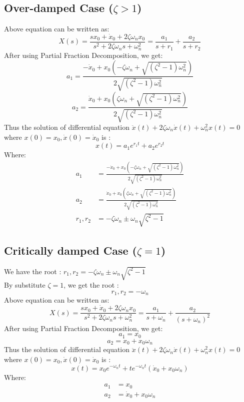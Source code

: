 \documentclass[12pt,a4paper]{article}
\begin{document}
	\subsection{Over-damped Case ($ \zeta > 1$)}
	Above equation can be written as:
	\[ 
	X(s) = \frac{sx_0 + \dot{x}_0 + 2\zeta\omega_nx_0}{s^2 + 2\zeta\omega_ns+\omega_n^2} = \frac{a_1}{s+r_1}+\frac{a_2}{s+r_2}
	\]
	After using Partial Fraction Decomposition, we get:
	\[ 
	a_1 = \frac{-\dot{x}_0 + x_0 (-\zeta \omega_n + \sqrt{(\zeta^2-1)\omega_n^2})}{2\sqrt{(\zeta^2-1)\omega_n^2}}
	\]
	\[ 
	a_2 = \frac{\dot{x}_0 + x_0 (\zeta \omega_n + \sqrt{(\zeta^2-1)\omega_n^2})}{2\sqrt{(\zeta^2-1)\omega_n^2}}
	\]
	Thus the solution of differential equation $ \ddot{x}(t)+2\zeta\omega_n\dot{x}(t)+\omega_n^2x(t)=0  $ where $ x(0)=x_0, \dot{x}(0) = \dot{x}_0 $ is :
	\[ 
	x(t) = a_1e^{r_1t}+a_2e^{r_2t} 
	\]
	Where:
	\[
	\begin{split}
		a_1 &= \frac{-\dot{x}_0 + x_0 (-\zeta \omega_n + \sqrt{(\zeta^2-1)\omega_n^2})}{2\sqrt{(\zeta^2-1)\omega_n^2}} \\
		a_2 &= \frac{\dot{x}_0 + x_0 (\zeta \omega_n + \sqrt{(\zeta^2-1)\omega_n^2})}{2\sqrt{(\zeta^2-1)\omega_n^2}} \\
		r_1,r_2 &= -\zeta\omega_n \pm \omega_n\sqrt{\zeta^2-1}
	\end{split} 
	\]
	
	\subsection{Critically damped Case ($ \zeta = 1$)}
	We have the root : $ r_1,r_2 = -\zeta\omega_n \pm \omega_n\sqrt{\zeta^2-1} $\\
	By substitute $ \zeta = 1 $, we get the root : 
	\[ r_1,r_2 = -\omega_n \]
	Above equation can be written as:
	\[ 
	X(s) = \frac{sx_0 + \dot{x}_0 + 2\zeta\omega_nx_0}{s^2 + 2\zeta\omega_ns+\omega_n^2} = \frac{a_1}{s+\omega_n}+\frac{a_2}{(s+\omega_n)^2}
	\]
	After using Partial Fraction Decomposition, we get:
	\[ 
	a_1 = x_0
	\]
	\[ 
	a_2 = \dot{x}_0 + x_0\omega_n
	\]
	Thus the solution of differential equation $ \ddot{x}(t)+2\zeta\omega_n\dot{x}(t)+\omega_n^2x(t)=0  $ where $ x(0)=x_0, \dot{x}(0) = \dot{x}_0 $ is :
	\[ 
	x(t) = x_0e^{-\omega_nt}+te^{-\omega_nt}(\dot{x}_0+x_0\omega_n)
	\]
	Where:
	\[
	\begin{split}
		a_1 &= x_0\\
		a_2 &= \dot{x}_0 + x_0\omega_n
	\end{split} 
	\]
	
	
\end{document}
